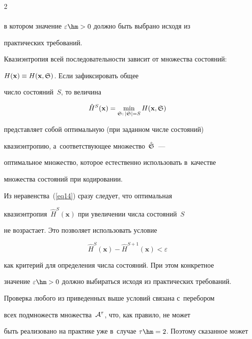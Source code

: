 \begin{multicols}{2}
\begin{multline*}
\end{multline*}

в котором значение $\varepsilon\hm>0$ должно быть выбрано исходя из 

практических требований.



Квазиэнтропия всей последовательности зависит от множества состояний: 

$H(\mathbf{x})\equiv H(\mathbf{x},{\frak S})$. Если зафиксировать общее 

число состояний~$S$, то величина

\begin{equation}

\label{eq15}

\hat{H}^{S}(\mathbf{x}) = \min\limits_{{\frak S}:\:|{\frak S}|=S} 

H(\mathbf{x},{\frak S})

\end{equation}

представляет собой оптимальную (при заданном числе состояний) 

квазиэнтропию, а~соответ\-ст\-ву\-ющее мно\-жество~$\hat{\frak S}$~--- 

оптимальное мно\-жество, которое естественно использовать в~качестве 

мно\-же\-ст\-ва состояний при кодировании.



Из неравенства~(\ref{eq14}) сразу следует, что оптимальная 

квазиэнтропия~$\hat{H}^{S}(\mathbf{x})$ при увеличении числа состояний~$S$ 

не возрастает. Это позволяет использовать условие

$$

\hat{H}^{S}(\mathbf{x}) - \hat{H}^{S+1}(\mathbf{x}) < \varepsilon

$$

как критерий для определения числа состояний. При этом конкретное 

значение $\varepsilon\hm>0$ должно выбираться исходя из практических требований.



Проверка любого из приведенных выше условий связана с~перебором 

всех подмножеств множества~${\cal A}^\tau$, что, как правило, не может 

быть реализовано на практике уже в~случае $\tau\hm=2$. Поэтому сказанное может 


\end{multicols}
